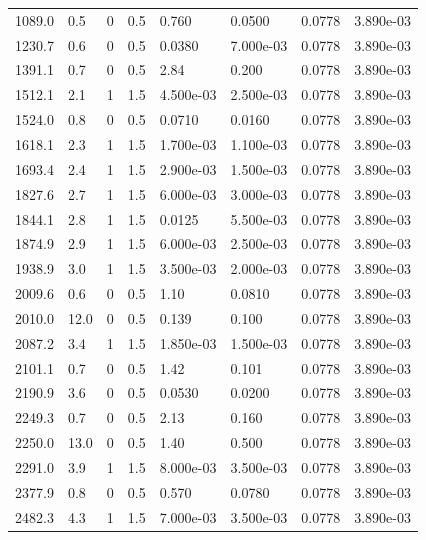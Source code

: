 \documentclass[preview]{standalone}
\begin{document}
{{\begin{tabular}{L{1.2cm}C{1.2cm} C{0.3cm}C{0.5cm} C{1.4cm}C{1.4cm} C{1.4cm}C{1.4cm}}
  1089.0  &   0.5  & 0     & 0.5 &  0.760  & 0.0500  & 0.0778 &  3.890e-03   \\ 
  1230.7  &   0.6  & 0     & 0.5 &  0.0380  & 7.000e-03  & 0.0778 &  3.890e-03   \\ 
  1391.1  &   0.7  & 0     & 0.5 &  2.84  & 0.200  & 0.0778 &  3.890e-03   \\ 
  1512.1  &   2.1  & 1     & 1.5 &  4.500e-03  & 2.500e-03  & 0.0778 &  3.890e-03   \\ 
  1524.0  &   0.8  & 0     & 0.5 &  0.0710  & 0.0160  & 0.0778 &  3.890e-03   \\ 
  1618.1  &   2.3  & 1     & 1.5 &  1.700e-03  & 1.100e-03  & 0.0778 &  3.890e-03   \\ 
  1693.4  &   2.4  & 1     & 1.5 &  2.900e-03  & 1.500e-03  & 0.0778 &  3.890e-03   \\ 
  1827.6  &   2.7  & 1     & 1.5 &  6.000e-03  & 3.000e-03  & 0.0778 &  3.890e-03   \\ 
  1844.1  &   2.8  & 1     & 1.5 &  0.0125  & 5.500e-03  & 0.0778 &  3.890e-03   \\ 
  1874.9  &   2.9  & 1     & 1.5 &  6.000e-03  & 2.500e-03  & 0.0778 &  3.890e-03   \\ 
  1938.9  &   3.0  & 1     & 1.5 &  3.500e-03  & 2.000e-03  & 0.0778 &  3.890e-03   \\ 
  2009.6  &   0.6  & 0     & 0.5 &  1.10  & 0.0810  & 0.0778 &  3.890e-03   \\ 
  2010.0  &  12.0  & 0     & 0.5 &  0.139  & 0.100  & 0.0778 &  3.890e-03   \\ 
  2087.2  &   3.4  & 1     & 1.5 &  1.850e-03  & 1.500e-03  & 0.0778 &  3.890e-03   \\ 
  2101.1  &   0.7  & 0     & 0.5 &  1.42  & 0.101  & 0.0778 &  3.890e-03   \\ 
  2190.9  &   3.6  & 0     & 0.5 &  0.0530  & 0.0200  & 0.0778 &  3.890e-03   \\ 
  2249.3  &   0.7  & 0     & 0.5 &  2.13  & 0.160  & 0.0778 &  3.890e-03   \\ 
  2250.0  &  13.0  & 0     & 0.5 &  1.40  & 0.500  & 0.0778 &  3.890e-03   \\ 
  2291.0  &   3.9  & 1     & 1.5 &  8.000e-03  & 3.500e-03  & 0.0778 &  3.890e-03   \\ 
  2377.9  &   0.8  & 0     & 0.5 &  0.570  & 0.0780  & 0.0778 &  3.890e-03   \\ 
  2482.3  &   4.3  & 1     & 1.5 &  7.000e-03  & 3.500e-03  & 0.0778 &  3.890e-03   \\ 

\end{tabular}}}
\end{document}
